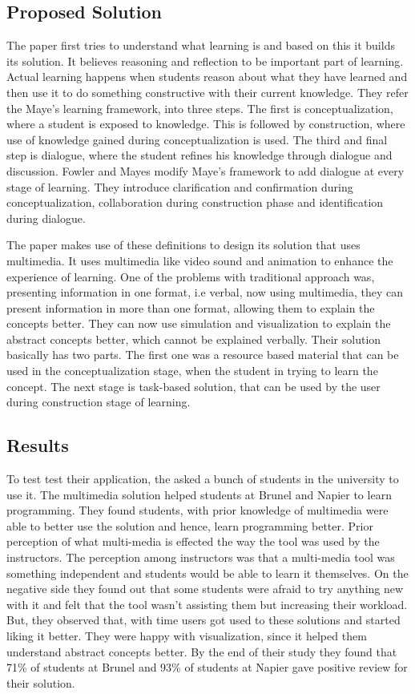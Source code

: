 \documentclass[12pt, onecolumn]{IEEEtran}
\begin{document}
\subsection{Proposed Solution}
The paper first tries to understand what learning is and based on this it builds
its solution. It believes reasoning and reflection to be important part of
learning. Actual learning happens when students reason about what they have
learned and then use it to do something constructive with their current
knowledge. They refer the Maye's learning framework, into three steps. The first is
conceptualization, where a student is exposed to knowledge. This is followed by
construction, where use of knowledge gained during conceptualization is used. The
third and final step is  dialogue, where the student refines his knowledge
through dialogue and discussion. Fowler and Mayes modify Maye's framework to add
dialogue at every stage of learning. They introduce clarification and
confirmation during conceptualization,  collaboration during construction phase
and identification during dialogue.

The paper makes use of these definitions to design its solution that uses
multimedia. It uses multimedia like video sound and animation to enhance the
experience of learning. One of the problems with traditional approach was,
presenting information in one format, i.e verbal, now using multimedia, they can
present information in more than one format, allowing them to explain the
concepts better. They can now use simulation and visualization to explain the
abstract concepts better, which cannot be explained verbally. Their solution
basically has two parts. The first one was a resource based material that can
be used in the conceptualization stage, when the student in trying to learn the
concept. The next stage is task-based solution, that can be used by the user
during construction stage of learning.

\subsection{Results}
To test test their application, the asked a bunch of students in the university
to use it. The multimedia solution helped students at Brunel and Napier to 
learn programming. They found students, with prior knowledge of multimedia were
able to better use the solution and hence, learn programming better. Prior
perception of what multi-media is effected the way the tool was used by the
instructors. The perception among instructors was that a multi-media tool was
something independent and students would be able to learn it themselves. On
the negative side they found out that some students were afraid to try anything
new with it and felt that the tool wasn't assisting them but increasing their
workload. But, they observed that, with time users got used to these solutions
and started liking it better. They were happy with visualization, since it
helped them understand abstract concepts better. By the end of their study they
found that 71\% of students at Brunel and 93\% of students at Napier gave
positive review for their solution.
\\
\end{document}
